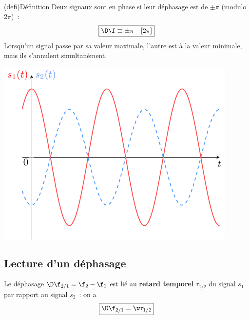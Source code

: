 \documentclass[../../main/main.tex]{subfiles}
\begin{document}
\begin{minipage}{0.70\linewidth}
	\begin{tcb}(defi){\small Définition}
		Deux signaux sont en phase si leur déphasage est de $\pm\pi$ (modulo $2\pi$)~:
		\[\boxed{\D\f \equiv \pm\pi \quad[2\pi]}\]
		Lorsqu'un signal passe par sa valeur maximale, l'autre est à la valeur
		minimale, mais ils s'annulent simultanément.
	\end{tcb}
\end{minipage}
\hfill
\begin{minipage}{0.30\linewidth}
	\begin{center}
		\includegraphics[width=\linewidth]{dfeqpi.pdf}
	\end{center}
\end{minipage}

\subsection{Lecture d'un déphasage}
Le déphasage $\D\f_{2/1} = \f_2 - \f_1$ est lié au \textbf{retard temporel}
$\tau_{1/2}$ du signal $s_1$ par rapport au signal $s_2$~: on a
\[\boxed{\D\f_{2/1} = \w\tau_{1/2}}\]
\end{document}
